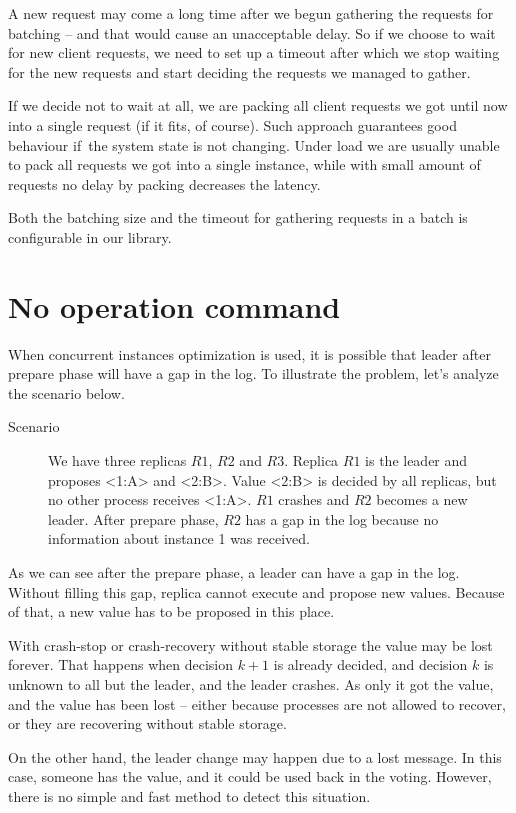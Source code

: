 A new request may come a long time after we begun gathering the requests for batching -- and that would cause an unacceptable delay. So if we choose to wait for new client requests, we need to set up a timeout after which we stop waiting for the new requests and start deciding the requests we managed to gather.

If we decide not to wait at all, we are packing all client requests we got until now into a single request (if it fits, of course). Such approach guarantees good behaviour if~the system state is not changing. Under load  we are usually unable to pack all requests we got into a single instance, while with small amount of requests no delay by packing decreases the latency.

Both the batching size and the timeout for gathering requests in a batch is con\-figurable in our library.


\section{No operation command}

When concurrent instances optimization is used, it is possible that leader after prepare phase will have a gap in the log. To illustrate the problem, let's analyze the scenario below.

\begin{description}
  \item [Scenario] We have three replicas $R1$, $R2$ and $R3$. Replica $R1$ is the leader and proposes <1:A> and <2:B>. Value <2:B> is decided by all replicas, but no other process receives <1:A>. $R1$ crashes and $R2$ becomes a new leader. After prepare phase, $R2$ has a gap in the log because no information about instance 1 was received.
\end{description} 

As we can see after the prepare phase, a leader can have a gap in the log. Without filling this gap, replica cannot execute and propose new values. Because of that, a new value has to be proposed in this place.

With crash-stop or crash-recovery without stable storage the value may be lost forever. That happens when decision $k+1$ is already decided, and decision $k$ is unknown to all but the leader, and the leader crashes. As only it got the value, and the value has been lost -- either because processes are not allowed to recover, or they are recovering without stable storage.

On the other hand, the leader change may happen due to a lost \alive message. \linebreak In this case, someone has the value, and it could be used back in the voting. However, there is no simple and fast method to detect this situation.

